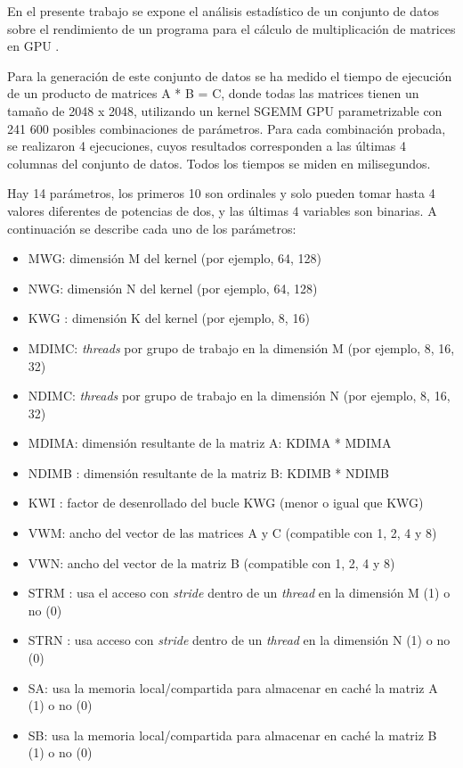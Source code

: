 En el presente trabajo se expone el análisis estadístico de un conjunto de datos sobre el rendimiento de un programa para el cálculo de multiplicación de matrices en GPU \citep{ballesterripoll2017sobol}\citep{Nugteren2015}. 

Para la generación de este conjunto de datos se ha medido el tiempo de ejecución de un producto de matrices A * B = C, donde todas las matrices tienen un tamaño de 2048 x 2048, utilizando un kernel SGEMM GPU parametrizable con 241 600 posibles combinaciones de parámetros. Para cada combinación probada, se realizaron 4 ejecuciones, cuyos resultados corresponden a las últimas 4 columnas del conjunto de datos. Todos los tiempos se miden en milisegundos. 

Hay 14 parámetros, los primeros 10 son ordinales y solo pueden tomar hasta 4 valores diferentes de potencias de dos, y las últimas 4 variables son binarias. A continuación se describe cada uno de los parámetros:

\begin{itemize}
    \item  MWG: dimensión M del kernel (por ejemplo, 64, 128)
    \item  NWG: dimensión N del kernel (por ejemplo, 64, 128)
    \item  KWG : dimensión K del kernel (por ejemplo, 8, 16)
    \item  MDIMC: \textit{threads} por grupo de trabajo en la dimensión M (por ejemplo, 8, 16, 32)
    \item  NDIMC: \textit{threads} por grupo de trabajo en la dimensión N (por ejemplo, 8, 16, 32)
    \item  MDIMA: dimensión resultante de la matriz A: KDIMA * MDIMA
    \item  NDIMB : dimensión resultante de la matriz B: KDIMB * NDIMB
    \item  KWI : factor de desenrollado del bucle KWG (menor o igual que KWG)
    \item  VWM: ancho del vector de las matrices A y C (compatible con 1, 2, 4 y 8)
    \item  VWN: ancho del vector de la matriz B (compatible con 1, 2, 4 y 8)
    \item  STRM : usa el acceso con \textit{stride} dentro de un \textit{thread} en la dimensión M (1) o no (0)
    \item  STRN : usa acceso con \textit{stride} dentro de un \textit{thread} en la dimensión N (1) o no (0)
    \item  SA: usa la memoria local/compartida para almacenar en caché la matriz A (1) o no (0)
    \item  SB: usa la memoria local/compartida para almacenar en caché la matriz B (1) o no (0)
\end{itemize}


